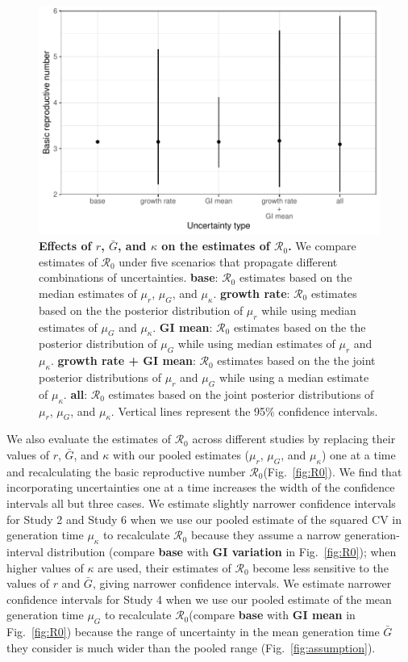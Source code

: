 \documentclass[12pt]{article}
\newcommand{\fref}[1]{Fig.~\ref{fig:#1}}
\newcommand{\Rx}[1]{\ensuremath{{\mathcal R}_{#1}}}
\newcommand{\Ro}{\Rx{0}\xspace}
\begin{document}
\begin{figure}[!ht]
\includegraphics[width=\textwidth]{figure2.pdf}
\caption{
\textbf{Effects of $r$, $\bar G$, and $\kappa$ on the estimates of \Ro.}
We compare estimates of \Ro under five scenarios that propagate different combinations of uncertainties.
\textbf{base}: \Ro estimates based on the median estimates of $\mu_r$, $\mu_G$, and $\mu_\kappa$.
\textbf{growth rate}: \Ro estimates based on the the posterior distribution of $\mu_r$ while using median estimates of $\mu_G$ and $\mu_\kappa$.
\textbf{GI mean}: \Ro estimates based on the the posterior distribution of $\mu_G$ while using median estimates of $\mu_r$ and $\mu_\kappa$.
\textbf{growth rate + GI mean}: \Ro estimates based on the the joint posterior distributions of $\mu_r$ and $\mu_G$ while using a median estimate of $\mu_\kappa$.
\textbf{all}: \Ro estimates based on the joint posterior distributions of  $\mu_r$, $\mu_G$, and $\mu_\kappa$.
Vertical lines represent the 95\% confidence intervals.
}
\label{fig:eff}
\end{figure}

We also evaluate the estimates of \Ro across different studies by 
replacing their values of $r$, $\bar G$, and $\kappa$ with our pooled estimates ($\mu_r$, $\mu_G$, and $\mu_\kappa$) one at a time and recalculating the basic reproductive number \Ro (\fref{R0}).
We find that incorporating uncertainties one at a time increases the width of the confidence intervals all but three cases.
We estimate slightly narrower confidence intervals for Study 2 and Study 6 when we use our pooled estimate of the squared CV in generation time $\mu_\kappa$ to recalculate \Ro because they assume a narrow generation-interval distribution (compare \textbf{base} with \textbf{GI variation} in \fref{R0});
when higher values of $\kappa$ are used, their estimates of \Ro become less sensitive to the values of $r$ and $\bar G$, giving narrower confidence intervals.
We estimate narrower confidence intervals for Study 4 when we use our pooled estimate of the mean generation time $\mu_G$ to recalculate \Ro (compare \textbf{base} with \textbf{GI mean} in \fref{R0}) because the range of uncertainty in the mean generation time $\bar G$ they consider is much wider than the pooled range (\fref{assumption}).
\end{document}
